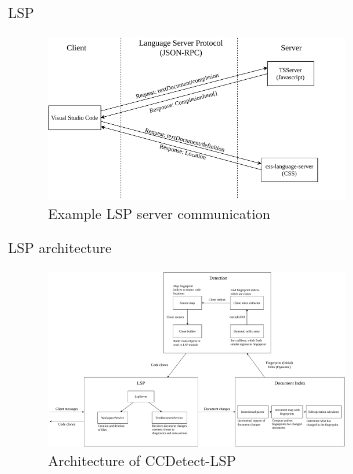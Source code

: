 \documentclass[aspectratio=1610, xcolor=table]{beamer}
\begin{document}
\begin{frame}{LSP}
    \begin{figure}
        \begin{center}
            \includegraphics[width=0.7\textwidth]{figures/lspcommunication.drawio.pdf}
        \end{center}
        \caption{Example LSP server communication}
    \end{figure}
\end{frame}

\begin{frame}{LSP architecture}
    \begin{figure}
        \begin{center}
            \includegraphics[width=0.7\textwidth]{figures/architecture.drawio.pdf}
        \end{center}
        \caption{Architecture of CCDetect-LSP}
    \end{figure}
\end{frame}
\end{document}
